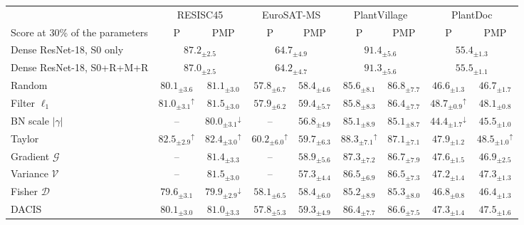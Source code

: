 \begin{tabular}{@{}lcccccccc@{}}
\toprule
 & \multicolumn{2}{c}{RESISC45} & \multicolumn{2}{c}{EuroSAT-MS} & \multicolumn{2}{c}{PlantVillage} & \multicolumn{2}{c}{PlantDoc} \\
\cmidrule(lr){2-3}\cmidrule(lr){4-5}\cmidrule(lr){6-7}\cmidrule(lr){8-9}
Score at 30\% of the parameters & P & PMP & P & PMP & P & PMP & P & PMP \\
\midrule
Dense ResNet-18, S0 only & \multicolumn{2}{c}{$87.2_{\pm2.5}$} & \multicolumn{2}{c}{$64.7_{\pm4.9}$} & \multicolumn{2}{c}{$91.4_{\pm5.6}$} & \multicolumn{2}{c}{$55.4_{\pm1.3}$} \\
Dense ResNet-18, S0+R+M+R & \multicolumn{2}{c}{$87.0_{\pm2.5}$} & \multicolumn{2}{c}{$64.2_{\pm4.7}$} & \multicolumn{2}{c}{$91.3_{\pm5.6}$} & \multicolumn{2}{c}{$55.5_{\pm1.1}$} \\
\midrule
Random & $80.1_{\pm3.6}$ & $81.1_{\pm3.0}$ & $57.8_{\pm6.7}$ & $58.4_{\pm4.6}$ & $85.6_{\pm8.1}$ & $86.8_{\pm7.7}$ & $46.6_{\pm1.3}$ & $46.7_{\pm1.7}$ \\
Filter $\ell_1$ & $81.0_{\pm3.1}$$^{\uparrow}$ & $81.5_{\pm3.0}$ & $57.9_{\pm6.2}$ & $59.4_{\pm5.7}$ & $85.8_{\pm8.3}$ & $86.4_{\pm7.7}$ & $48.7_{\pm0.9}$$^{\uparrow}$ & $48.1_{\pm0.8}$ \\
BN scale $|\gamma|$ & -- & $80.0_{\pm3.1}$$^{\downarrow}$ & -- & $56.8_{\pm4.9}$ & $85.1_{\pm8.9}$ & $85.1_{\pm8.7}$ & $44.4_{\pm1.7}$$^{\downarrow}$ & $45.5_{\pm1.0}$ \\
Taylor & $82.5_{\pm2.9}$$^{\uparrow}$ & $82.4_{\pm3.0}$$^{\uparrow}$ & $60.2_{\pm6.0}$$^{\uparrow}$ & $59.7_{\pm6.3}$ & $88.3_{\pm7.1}$$^{\uparrow}$ & $87.1_{\pm7.1}$ & $47.9_{\pm1.2}$ & $48.5_{\pm1.0}$$^{\uparrow}$ \\
Gradient $\mathcal{G}$ & -- & $81.4_{\pm3.3}$ & -- & $58.9_{\pm5.6}$ & $87.3_{\pm7.2}$ & $86.7_{\pm7.9}$ & $47.6_{\pm1.5}$ & $46.9_{\pm2.5}$ \\
Variance $\mathcal{V}$ & -- & $81.5_{\pm3.0}$ & -- & $57.3_{\pm4.4}$ & $86.5_{\pm6.9}$ & $86.5_{\pm7.3}$ & $47.2_{\pm1.4}$ & $47.3_{\pm1.3}$ \\
Fisher $\mathcal{D}$ & $79.6_{\pm3.1}$ & $79.9_{\pm2.9}$$^{\downarrow}$ & $58.1_{\pm6.5}$ & $58.4_{\pm6.0}$ & $85.2_{\pm8.9}$ & $85.3_{\pm8.0}$ & $46.8_{\pm0.8}$ & $46.4_{\pm1.3}$ \\
DACIS & $80.1_{\pm3.0}$ & $81.0_{\pm3.3}$ & $57.8_{\pm5.3}$ & $59.3_{\pm4.9}$ & $86.4_{\pm7.7}$ & $86.6_{\pm7.5}$ & $47.3_{\pm1.4}$ & $47.5_{\pm1.6}$ \\
\bottomrule
\end{tabular}